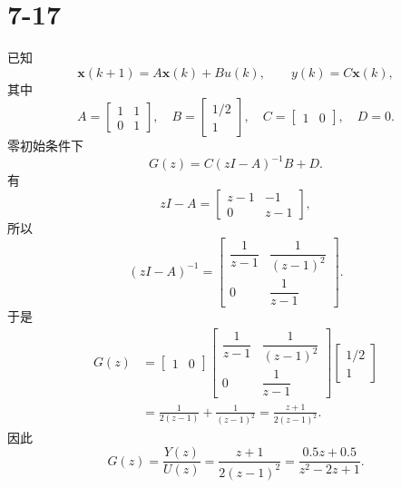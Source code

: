 \documentclass[UTF8,a4paper,11pt]{ctexart}
\begin{document}
\section*{7-17}
已知
\[
\bm x(k+1)=A\bm x(k)+Bu(k),\qquad y(k)=C\bm x(k),
\]
其中
\[
A=\begin{bmatrix}1&1\\0&1\end{bmatrix},\quad
B=\begin{bmatrix}1/2\\1\end{bmatrix},\quad
C=\begin{bmatrix}1&0\end{bmatrix},\quad D=0.
\]
零初始条件下
\[
G(z)=C(zI-A)^{-1}B+D.
\]
有
\[
zI-A=
\begin{bmatrix}z-1&-1\\0&z-1\end{bmatrix},
\]
所以
\[
(zI-A)^{-1}=
\begin{bmatrix}
\dfrac{1}{z-1}&\dfrac{1}{(z-1)^2}\\[6pt]
0&\dfrac{1}{z-1}
\end{bmatrix}.
\]
于是
\[
\begin{aligned}
G(z)
&=
\begin{bmatrix}1&0\end{bmatrix}
\begin{bmatrix}
\dfrac{1}{z-1}&\dfrac{1}{(z-1)^2}\\
0&\dfrac{1}{z-1}
\end{bmatrix}
\begin{bmatrix}1/2\\1\end{bmatrix}\\
&=\frac{1}{2(z-1)}+\frac{1}{(z-1)^2}
=\frac{z+1}{2(z-1)^2}.
\end{aligned}
\]
因此
\[
\boxed{
G(z)=\frac{Y(z)}{U(z)}
=\frac{z+1}{2(z-1)^2}
=\frac{0.5z+0.5}{z^2-2z+1}
}.
\]
\end{document}
